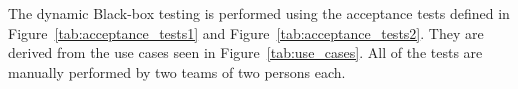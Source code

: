 
The dynamic Black-box testing is performed using the acceptance tests defined in Figure~\ref{tab:acceptance_tests1} and Figure~\ref{tab:acceptance_tests2}.
They are derived from the use cases seen in Figure~\ref{tab:use_cases}.%
All of the tests are manually performed by two teams of two persons each. \\


